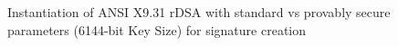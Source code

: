 \documentclass[]{final_report}
\theoremstyle{definition}
\begin{document}
\begin{figure}[H]
    \centering %
     \caption{Instantiation of ANSI X9.31 rDSA with standard vs provably secure parameters (6144-bit Key Size) for signature creation}
    \begin{minipage}{\textwidth}
        \centering
    \end{minipage}
         \label{ansi_sign_6144bit_table}
\end{figure}
\end{document}
